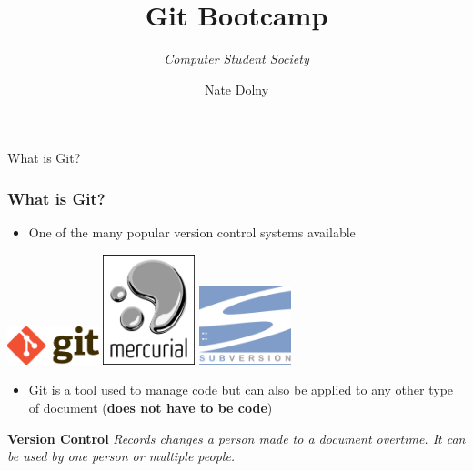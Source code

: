 \documentclass{beamer}
\title{\textbf{Git Bootcamp}}
\subtitle{\textit{Computer Student Society}}
\author{Nate Dolny}
\date{}
\begin{document}
\begin{frame}
	\titlepage
\end{frame}

\begin{frame}{What is Git?}
	\frametitle{\textbf{What is Git?}}
	\begin{itemize}
		\item One of the many popular version control systems available
	\end{itemize}

	\begin{center}
		\includegraphics[width=0.2\textwidth]{img/Git-Logo.png} 
		\hspace{1cm}
		\includegraphics[width=0.2\textwidth]{img/Mercurial_logo.png} 
		\hspace{1cm}
		\includegraphics[width=0.2\textwidth]{img/Apache_Subversion_logo.png} 
		\hspace{1cm}
	\end{center}	

	\begin{itemize}
		\item Git is a tool used to manage code but can also be applied to any other type of document (\textbf{does not have to be code})
	\end{itemize}
	
	\begin{block}{\textbf{Version Control}}
		\textit{Records changes a person made to a document overtime. It can be used by one person or multiple people.}
	\end{block}
\end{frame}
\end{document}
